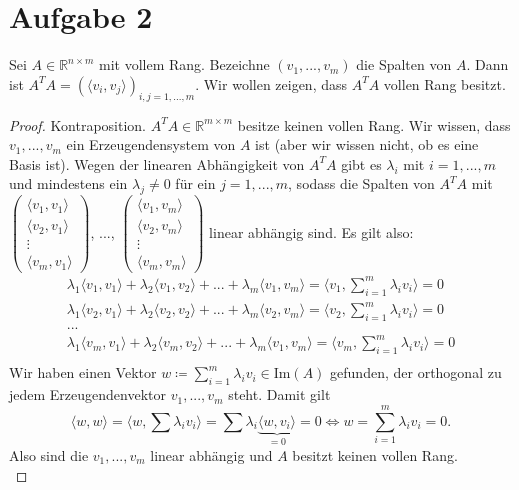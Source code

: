 \documentclass[9pt]{extarticle}
\theoremstyle{named}
\begin{document}
\section*{Aufgabe 2}
Sei $A \in \mathbb R^{n \times m}$ mit vollem Rang. Bezeichne $(v_1,...,v_m)$ die Spalten von $A$. Dann ist $ A^TA = (\langle v_i,v_j \rangle)_{i,j = 1,...,m}$. Wir wollen zeigen, dass $A^TA$ vollen Rang besitzt. 

\begin{proof}
	Kontraposition. $A^TA \in \mathbb R^{m \times m}$ besitze keinen vollen Rang. Wir wissen, dass $v_1,...,v_m$ ein Erzeugendensystem von $A$ ist (aber wir wissen nicht, ob es eine Basis ist). Wegen der linearen Abhängigkeit von $A^TA$ gibt es $\lambda_i$ mit $i=1,...,m$ und mindestens ein $\lambda_j \neq 0$ für ein $j = 1,...,m$, sodass die Spalten von $A^TA$ mit $\begin{pmatrix}
	\langle v_1,v_1 \rangle \\ \langle v_2,v_1 \rangle \\ \vdots \\ \langle v_m,v_1 \rangle
	\end{pmatrix}$, ...,  $\begin{pmatrix}
	\langle v_1,v_m \rangle \\ \langle v_2,v_m \rangle \\ \vdots \\ \langle v_m,v_m \rangle
	\end{pmatrix}$ linear abhängig sind. Es gilt also:
	\begin{align*}
		\lambda_1 \langle v_1, v_1 \rangle + \lambda_2 \langle v_1, v_2 \rangle + ... + \lambda_m \langle v_1,v_m \rangle   = \langle v_1, \sum^m_{i=1}\lambda_i v_i \rangle = 0 \\
		\lambda_1 \langle v_2, v_1 \rangle + \lambda_2 \langle v_2, v_2 \rangle + ... + \lambda_m \langle v_2,v_m \rangle   = \langle v_2, \sum^m_{i=1}\lambda_i v_i \rangle = 0 \\
		... \\
		\lambda_1 \langle v_m, v_1 \rangle + \lambda_2 \langle v_m, v_2 \rangle + ... + \lambda_m \langle v_1,v_m \rangle   = \langle v_m, \sum^m_{i=1}\lambda_i v_i \rangle = 0 \\
	\end{align*}
	Wir haben einen Vektor $w \coloneqq \sum^m_{i=1}\lambda_i v_i \in \mathrm{Im}(A)$ gefunden, der orthogonal zu jedem Erzeugendenvektor $v_1,...,v_m$ steht. Damit gilt $$\langle w,w \rangle = \langle w, \sum \lambda_i v_i \rangle = \sum \lambda_i \underbrace{\langle w, v_i \rangle}_{=0} = 0 \iff w = \sum^m_{i=1}\lambda_i v_i = 0.$$
	Also sind die $v_1,...,v_m$ linear abhängig und $A$ besitzt keinen vollen Rang.\\
\end{proof}
\end{document}
